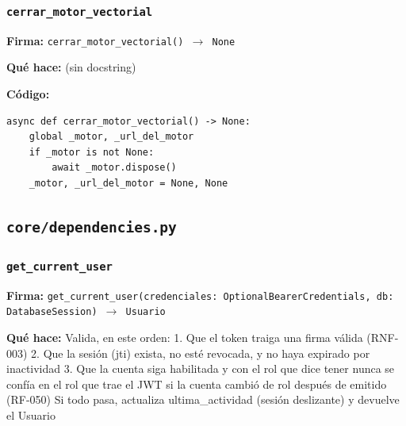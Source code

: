 \documentclass[11pt,a4paper]{article}
\begin{document}
\subsubsection*{\texttt{cerrar\_motor\_vectorial}}
\textbf{Firma:} \texttt{cerrar\_motor\_vectorial() $\rightarrow$ None}

\textbf{Qué hace:} (sin docstring)

\textbf{Código:}
\begin{lstlisting}
async def cerrar_motor_vectorial() -> None:
    global _motor, _url_del_motor
    if _motor is not None:
        await _motor.dispose()
    _motor, _url_del_motor = None, None
\end{lstlisting}

\subsection{\texttt{core/dependencies.py}}

\subsubsection*{\texttt{get\_current\_user}}
\textbf{Firma:} \texttt{get\_current\_user(credenciales: OptionalBearerCredentials, db: DatabaseSession) $\rightarrow$ Usuario}

\textbf{Qué hace:} Valida, en este orden:
  1. Que el token traiga una firma válida (RNF-003)
  2. Que la sesión (jti) exista, no esté revocada, y no haya expirado
     por inactividad
  3. Que la cuenta siga habilitada y con el rol que dice tener
     nunca se confía en el rol que trae el JWT si la
     cuenta cambió de rol después de emitido (RF-050)
Si todo pasa, actualiza ultima\_actividad (sesión deslizante) y
devuelve el Usuario
\end{document}
